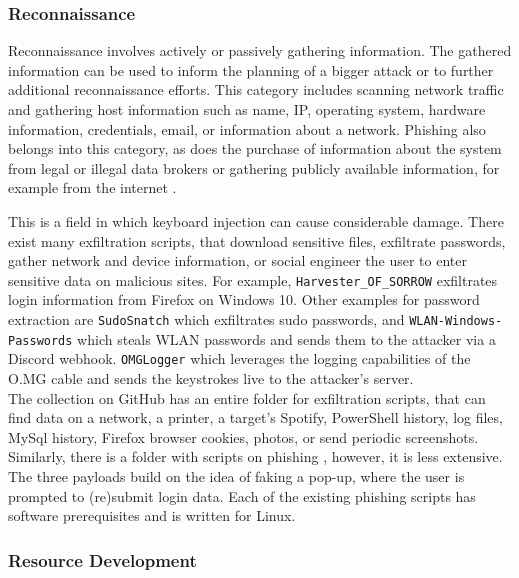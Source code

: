 \subsubsection{Reconnaissance}

Reconnaissance involves actively or passively gathering information. The gathered information can be used to inform the planning
of a bigger attack or to further additional reconnaissance efforts. This category includes scanning network traffic and gathering host information such as name, IP, operating system,
hardware information, credentials, email, or information about a network. Phishing also belongs into this category, as does the purchase of information about the system from legal
or illegal data brokers or gathering publicly available information, for example from the internet \cite{MITREATTCK}.

This is a field in which keyboard injection can cause considerable damage. There exist many exfiltration scripts, that download sensitive files, exfiltrate passwords,
gather network and device information, or social engineer the user to enter sensitive data on malicious sites.
For example, \verb|Harvester_OF_SORROW| \cite{OmgpayloadsPayloadsLibrary} exfiltrates login information from Firefox on Windows 10. Other examples for password extraction are \verb|SudoSnatch| \cite{OmgpayloadsPayloadsLibrary} which exfiltrates sudo passwords, and \verb|WLAN-Windows-Passwords| \cite{OmgpayloadsPayloadsLibrary}which steals WLAN passwords and sends them to the attacker via a Discord webhook. 
\verb|OMGLogger| \cite{OmgpayloadsPayloadsLibrary} which leverages the logging capabilities of the O.MG cable and sends the keystrokes live to the attacker's server. \\
The collection on GitHub has an entire folder for exfiltration scripts, that can find data on a network, a printer, a target's Spotify, PowerShell history, log files, MySql history,
Firefox browser cookies, photos, or send periodic screenshots. \\
Similarly, there is a folder with scripts on phishing  \cite{OmgpayloadsPayloadsLibrary}, however, it is less extensive. The three payloads build on the idea of faking a pop-up,
where the user is prompted to (re)submit login data. Each of the existing phishing scripts has software prerequisites and is written for Linux. \\


\subsubsection{Resource Development}

